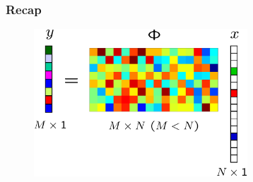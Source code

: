 \documentclass[xcolor=dvipsnames,10pt]{beamer}
\begin{document}
\begin{frame}
  \frametitle{Recap}
  \begin{figure}[h]
    \centering
    \includegraphics[width = 8cm]{csss}
  \end{figure}
\end{frame}
               
\end{document}
